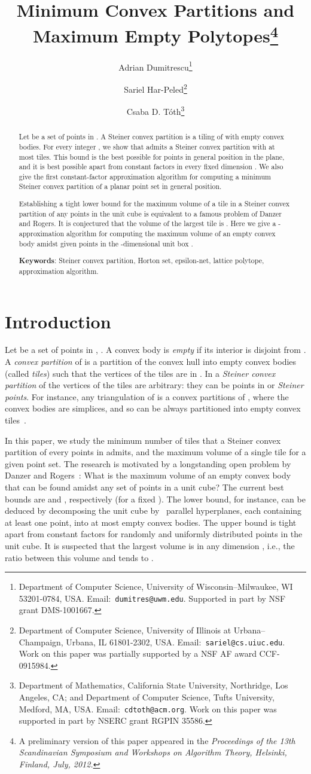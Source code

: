 \documentclass[11pt]{article}
\title{Minimum Convex Partitions and Maximum Empty Polytopes\footnote{A
preliminary version of this paper appeared in the {\em Proceedings of
the 13th Scandinavian Symposium and Workshops on Algorithm Theory,
Helsinki, Finland, July, 2012.}}}
\author{Adrian Dumitrescu\thanks{Department of Computer Science, University of
      Wisconsin--Milwaukee, WI 53201-0784, USA\@.
      Email:~\texttt{dumitres@uwm.edu}.  Supported in part by NSF
      grant DMS-1001667.}\and Sariel Har-Peled\thanks{Department of Computer Science, University of Illinois at
      Urbana--Champaign, Urbana, IL 61801-2302, USA\@.
      Email:~\texttt{sariel@cs.uiuc.edu}. Work on this paper was
      partially supported by a NSF AF award CCF-0915984.}\and Csaba D. T\'oth\thanks{Department of Mathematics,
      California State University, Northridge, Los Angeles, CA; and
      Department of Computer Science, Tufts University, Medford, MA, USA\@.
      Email:~\texttt{cdtoth@acm.org}.  Work on this paper was
      supported in part by NSERC grant RGPIN 35586.}}
\def\ie{{i.e.}}
\newcommand{\seclab}[1]{\label{sec:#1}}
\begin{document}
\maketitle

\begin{abstract}
    Let  be a set of  points in . A Steiner convex
    partition is a tiling of  with empty convex bodies.  For
    every integer , we show that  admits a Steiner convex
    partition with at most  tiles. This bound is
    the best possible for points in general position in the plane, and
    it is best possible apart from constant factors in every fixed
    dimension . We also give the first constant-factor
    approximation algorithm for computing a minimum Steiner convex
    partition of a planar point set in general position.

    Establishing a tight lower bound for the maximum volume of a tile
    in a Steiner convex partition of any  points in the unit cube is
    equivalent to a famous problem of Danzer and Rogers.  It is
    conjectured that the volume of the largest tile is .
    Here we give a -approximation
    algorithm for computing the maximum volume of an empty convex body
    amidst  given points in the -dimensional unit box .

    \medskip
    \noindent\textbf{\small Keywords}:
Steiner convex partition,
Horton set,
epsilon-net,
lattice polytope,
approximation algorithm.

\end{abstract}


\section{Introduction} \seclab{sec:intro}

Let  be a set of  points in , .  A
convex body  is \emph{empty} if its interior is disjoint from .
A \emph{convex partition} of  is a partition of the convex hull
 into empty convex bodies (called \emph{tiles}) such that
the vertices of the tiles are in . In a \emph{Steiner convex
   partition} of  the vertices of the tiles are arbitrary: they can
be points in  or \emph{Steiner points}.  For instance, any
triangulation of  is a convex partitions of , where the convex
bodies are simplices, and so  can be always partitioned into
 empty convex tiles~\cite{DRS10}.

In this paper, we study the minimum number of tiles that a Steiner
convex partition of every  points in  admits, and the
maximum volume of a single tile for a given point set.  The research
is motivated by a longstanding open problem by Danzer and
Rogers~\cite{ABFK92, BW71, BC87, FP94, PT12}:
What is the maximum volume of an empty convex body 
that can be found amidst any set  of  points in a
unit cube?  The current best bounds are  and
, respectively (for a fixed ).  The lower bound,
for instance, can be deduced by decomposing the unit cube by
~parallel hyperplanes, each containing at least one point, into at
most  empty convex bodies.
The upper bound is tight apart from constant factors for 
randomly and uniformly distributed points in the unit cube.
It is suspected that the
largest volume is  in any dimension , \ie, the
ratio between this volume and  tends to .
\end{document}
